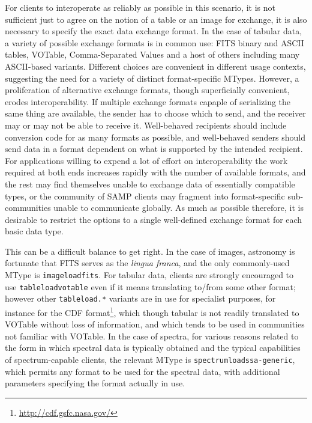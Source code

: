 \documentclass[5p]{elsarticle}
\begin{document}
For clients to interoperate as reliably as possible in this scenario,
it is not sufficient just to agree on the notion of a table or an image
for exchange, it is also necessary to specify the exact data exchange
format.
In the case of tabular data, a variety of possible exchange formats
is in common use: FITS binary and ASCII tables, VOTable,
Comma-Separated Values and a host of others including 
many ASCII-based variants.  Different choices are convenient in
different usage contexts, suggesting the need for a variety of
distinct format-specific MTypes.
However, a proliferation of alternative exchange formats,
though superficially convenient, erodes interoperability.
If multiple exchange formats capaple of serializing the same thing
are available,
the sender has to choose which to send, and the receiver may or
may not be able to receive it.
Well-behaved recipients should include conversion code for as many
formats as possible, and well-behaved senders should send data
in a format dependent on what is supported by the intended recipient.
For applications willing to expend a lot of effort on interoperability 
the work required at both ends increases rapidly with the number of
available formats, and the rest may find themselves unable to
exchange data of essentially compatible types,
or the community of SAMP clients may fragment into format-specific
sub-communities unable to communicate globally.
As much as possible therefore, it is desirable to restrict the options
to a single well-defined exchange format for each basic data type.

This can be a difficult balance to get right.
In the case of images, astronomy is fortunate that FITS serves as
the {\em lingua franca\/}, and the only commonly-used MType is
{\tt image{\kdot}load{\kdot}fits}.
For tabular data, clients are strongly encouraged to use
{\tt table{\kdot}load{\kdot}votable} even if it means translating to/from
some other format;
however other {\tt table{\kdot}load.*} variants are in use
for specialist purposes,
for instance for the CDF format\footnote{\url{http://cdf.gsfc.nasa.gov/}},
which though tabular is
not readily translated to VOTable without loss of information,
and which tends to be used in communities not familiar with VOTable.
In the case of spectra, for various reasons related to the
form in which spectral data is typically obtained and
the typical capabilities of spectrum-capable clients,
the relevant MType is {\tt spectrum{\kdot}load{\kdot}ssa-generic},
which permits any format to be used for the spectral data,
with additional parameters specifying
the format actually in use.
\end{document}
